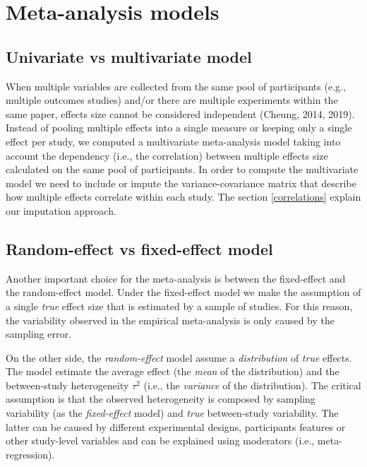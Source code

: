 \documentclass[
]{article}
\begin{document}
\hypertarget{models}{%
\section{Meta-analysis models}\label{models}}

\hypertarget{uni-vs-multi}{%
\subsection{Univariate vs multivariate model}\label{uni-vs-multi}}

When multiple variables are collected from the same pool of participants (e.g., multiple outcomes studies) and/or there are multiple experiments within the same paper, effects size cannot be considered independent (Cheung, 2014, 2019). Instead of pooling multiple effects into a single measure or keeping only a single effect per study, we computed a multivariate meta-analysis model taking into account the dependency (i.e., the correlation) between multiple effects size calculated on the same pool of participants. In order to compute the multivariate model we need to include or impute the variance-covariance matrix that describe how multiple effects correlate within each study. The section \ref{correlations} explain our imputation approach.

\hypertarget{random-effect-vs-fixed-effect-model}{%
\subsection{Random-effect vs fixed-effect model}\label{random-effect-vs-fixed-effect-model}}

Another important choice for the meta-analysis is between the fixed-effect and the random-effect model. Under the fixed-effect model we make the assumption of a single \emph{true} effect size that is estimated by a sample of studies. For this reason, the variability observed in the empirical meta-analysis is only caused by the sampling error.

On the other side, the \emph{random-effect} model assume a \emph{distribution} of \emph{true} effects. The model estimate the average effect (the \emph{mean} of the distribution) and the between-study heterogeneity \(\tau^2\) (i.e., the \emph{variance} of the distribution). The critical assumption is that the observed heterogeneity is composed by sampling variability (as the \emph{fixed-effect} model) and \emph{true} between-study variability. The latter can be caused by different experimental designs, participants features or other study-level variables and can be explained using moderators (i.e., meta-regression).
\end{document}
